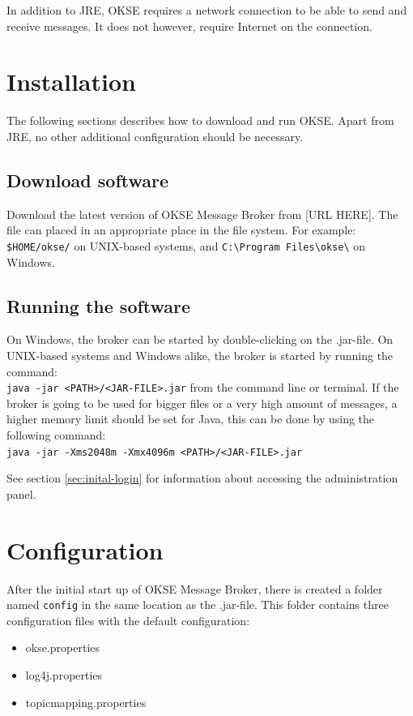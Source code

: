 In addition to JRE, OKSE requires a network connection to be able to send and receive messages. It does not however, require Internet on the connection. 

\section{Installation}

The following sections describes how to download and run OKSE. Apart from JRE, no other additional configuration should be necessary.

\subsection{Download software}

Download the latest version of OKSE Message Broker from [URL HERE].
The file can placed in an appropriate place in the file system. For example: \verb!$HOME/okse/! on UNIX-based systems, and \verb!C:\Program Files\okse\! on Windows.

\subsection{Running the software}

On Windows, the broker can be started by double-clicking on the .jar-file. On UNIX-based systems and Windows alike, the broker is started by running the command: \\ \verb!java -jar <PATH>/<JAR-FILE>.jar! from the command line or terminal. If the broker is going to be used for bigger files or a very high amount of messages, a higher memory limit should be set for Java, this can be done by using the following command: \\ \verb!java -jar -Xms2048m -Xmx4096m <PATH>/<JAR-FILE>.jar!

See section \ref{sec:inital-login} for information about accessing the administration panel.

\section{Configuration}

After the initial start up of OKSE Message Broker, there is created a folder named \verb!config! in the same location as the .jar-file. This folder contains three configuration files with the default configuration:

\begin{itemize}
\setlength{\itemsep}{0cm}%
\item okse.properties
\item log4j.properties
\item topicmapping.properties
\end{itemize}

